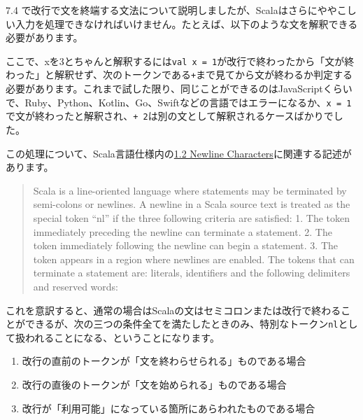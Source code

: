 7.4
で改行で文を終端する文法について説明しましたが、Scalaはさらにややこしい入力を処理できなければいけません。たとえば、以下のような文を解釈できる必要があります。

\begin{Shaded}
\begin{Highlighting}[]
\NormalTok{      + }
\end{Highlighting}
\end{Shaded}

ここで、xを3とちゃんと解釈するには\texttt{val\ x\ =\ 1}が改行で終わったから「文が終わった」と解釈せず、次のトークンである\texttt{+}まで見てから文が終わるか判定する必要があります。これまで試した限り、同じことができるのはJavaScriptくらいで、Ruby、Python、Kotlin、Go、Swiftなどの言語ではエラーになるか、\texttt{x\ =\ 1}で文が終わったと解釈され、\texttt{+\ 2}は別の文として解釈されるケースばかりでした。

この処理について、Scala言語仕様内の\href{https://scala-lang.org/files/archive/spec/2.13/01-lexical-syntax.html}{1.2
Newline Characters}に関連する記述があります。

\begin{quote}
Scala is a line-oriented language where statements may be terminated by
semi-colons or newlines. A newline in a Scala source text is treated as
the special token ``nl'' if the three following criteria are satisfied:
1. The token immediately preceding the newline can terminate a
statement. 2. The token immediately following the newline can begin a
statement. 3. The token appears in a region where newlines are enabled.
The tokens that can terminate a statement are: literals, identifiers and
the following delimiters and reserved words:
\end{quote}

これを意訳すると、通常の場合はScalaの文はセミコロンまたは改行で終わることができるが、次の三つの条件全てを満たしたときのみ、特別なトークン\texttt{nl}として扱われることになる、ということになります。

\begin{enumerate}
\def\labelenumi{\arabic{enumi}.}
\tightlist
\item
  改行の直前のトークンが「文を終わらせられる」ものである場合
\item
  改行の直後のトークンが「文を始められる」ものである場合
\item
  改行が「利用可能」になっている箇所にあらわれたものである場合
\end{enumerate}


